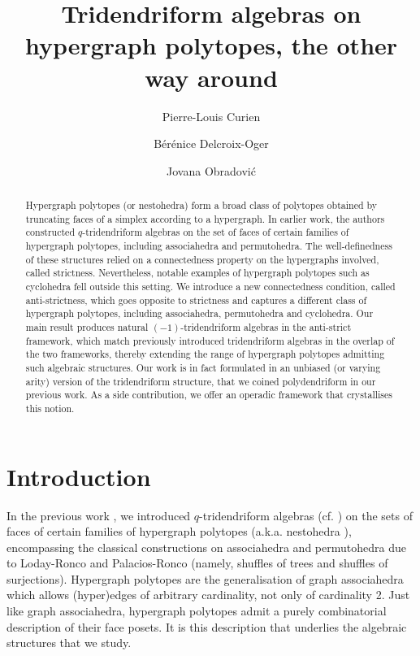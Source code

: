 \documentclass{article}
\title{Tridendriform algebras on hypergraph polytopes, the other way around}
\author[$^\dagger$]{  Pierre-Louis Curien}
\affil[$^\dagger$]{{\footnotesize Université Paris Cité,   CNRS, Inria, IRIF, Picube project-team,   Paris, France}}
\author[$^\ast$]{Bérénice Delcroix-Oger}
\affil[$^\ast$]{\footnotesize Université de Montpellier, CNRS, IMAG, Montpellier, France}
\author[$^\ddagger$]{Jovana Obradovi\' c }
\affil[$^\ddagger$]{\footnotesize Mathematical Institute of the Serbian Academy of Sciences and Arts, Belgrade, Serbia}
\theoremstyle{plain}
\theoremstyle{definition}
\begin{document}
\maketitle

\begin{abstract}
\noindent Hypergraph polytopes (or nestohedra) form a broad class of polytopes obtained by truncating faces of a simplex according to a hypergraph. In earlier work, the authors constructed $q$-tridendriform algebras on the set of faces of certain families of hypergraph polytopes, including associahedra and permutohedra. The well-definedness of these   structures relied on a connectedness property on the hypergraphs involved, called strictness. Nevertheless, notable examples of hypergraph polytopes such as   cyclohedra fell outside this setting. We introduce a new connectedness condition, called anti-strictness, which goes opposite to strictness and captures a different class of hypergraph polytopes, including associahedra, permutohedra and cyclohedra. Our main result produces natural $(-1)$-tridendriform algebras in the  anti-strict framework, which match previously introduced tridendriform algebras in the overlap of the two frameworks, thereby extending the range of hypergraph polytopes admitting such algebraic structures. Our work is in fact formulated in an unbiased (or varying arity) version of the tridendriform structure, that we coined polydendriform in our previous work. {As a side contribution, we offer an operadic framework that crystallises this notion.}
\end{abstract}

\section*{Introduction}
In the previous work \cite{PLBJ1}, 
we introduced $q$-tridendriform algebras (cf. \cite{BR}) on the sets of faces of certain families of hypergraph polytopes (a.k.a. nestohedra \cite{P09}), encompassing the classical constructions  on associahedra and permutohedra due to Loday-Ronco and Palacios-Ronco (namely, shuffles of trees and shuffles of surjections). Hypergraph polytopes are the   generalisation of graph associahedra which allows (hyper)edges of arbitrary cardinality, not only of cardinality 2. 
Just like graph associahedra, hypergraph polytopes admit a purely combinatorial description of their face posets. It is this description that underlies the  algebraic structures that we study. 

\smallskip
\end{document}
